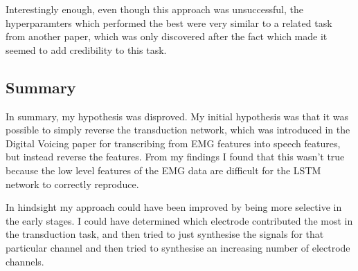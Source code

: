 Interestingly enough, even though this approach was unsuccessful,
the hyperparamters which performed the best were very similar to
a related task from another paper, which was only discovered after the
fact which made it seemed to add credibility to this task.

\subsection{Summary}

In summary, my hypothesis was disproved.
My initial hypothesis was that it was possible to simply reverse the
transduction network, which was introduced in the Digital Voicing paper
for transcribing from EMG features into speech features, but instead
reverse the features.
From my findings I found that this wasn't true because the low level 
features of the EMG data are difficult for the LSTM network to correctly
reproduce.

In hindsight my approach could have been improved by being more selective in
the early stages. I could have determined which electrode contributed the most
in the transduction task, and then tried to just synthesise the signals for that 
particular channel and then tried to synthesise an increasing number of
electrode channels.
